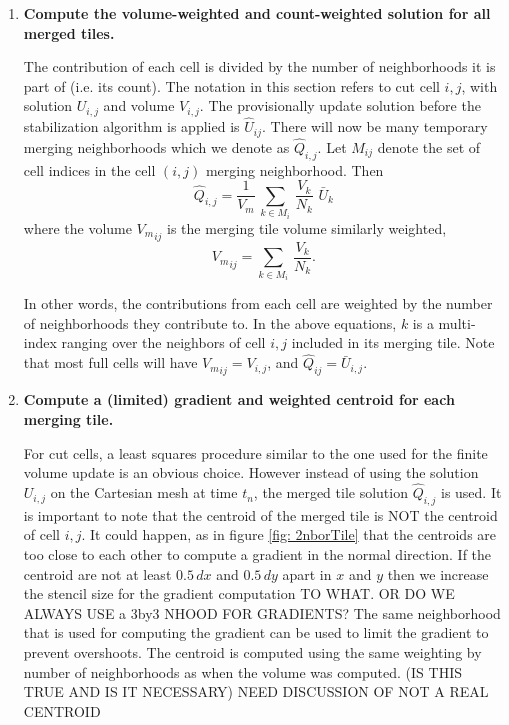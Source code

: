 \begin{enumerate}
\item
{\bf Compute the volume-weighted and count-weighted solution for all
merged tiles.}   

\vspace*{.1in}
The contribution of each cell is divided by the number of neighborhoods 
it is part of (i.e. its count). The notation in this section refers
to cut cell $i,j$, with solution $U_{i,j}$ and volume
$V_{i,j}$. 
The provisionally update solution before the
stabilization algorithm is applied is $\hat{U}_{ij}$.
There will now be many temporary merging neighborhoods which 
we denote as $\widehat{Q}_{i,j}$. 
Let $M_{ij}$ denote the set of cell indices in the cell $(i,j)$ merging
neighborhood.  Then
\begin{equation}
\label{tiledef}
\widehat{Q}_{i,j} =  \frac{1}{V_m} \, \sum_{k \in M_i} \,  
\frac{V_k}{N_k}  \,\,  \bar{U}_k
\end{equation}
where the volume ${V_m}_{ij}$ is the merging tile volume similarly weighted,
\begin{equation}
\label{voldef}
{V_m}_{ij}  =  \sum_{k \in M_i } \,  \frac{V_k}{N_k}  .
\end{equation}

In other words, the contributions from each cell are weighted by the
number of neighborhoods they contribute to.
In the above equations, $k$ is  a multi-index ranging over the neighbors 
of cell $i,j$ included in its merging tile.
Note that most full cells will have ${V_m}_{ij} = V_{i,j}$, 
and $\widehat{Q}_{ij}  = \bar{U}_{i,j}$.





\item
{\bf Compute a (limited) gradient and weighted centroid for each merging
tile.}

\vspace*{.1in}
For cut cells, a least squares procedure  similar to the one used for
the finite volume update is an obvious choice. However instead of using the
solution $U_{i,j}$ on the Cartesian mesh at time $t_n$,
the merged tile solution  $\widehat{Q}_{i,j}$ is used. It is important
to note that the centroid of the merged tile is NOT the 
centroid of cell ${i,j}$. It could happen, as in figure \ref{fig:
2nborTile} that the centroids are too close to each other to compute a
gradient in the normal direction. If the centroid are not at least
$0.5\,dx$  and $0.5\,dy$ apart in $x$ and $y$ then we increase the
stencil size for the gradient computation TO WHAT. OR DO WE ALWAYS USE a
3by3 NHOOD FOR GRADIENTS?
The same neighborhood that is used for computing the gradient can be
used to limit the gradient to prevent overshoots.
The centroid is computed using the same weighting by number of
neighborhoods as when the volume was computed. (IS THIS TRUE AND IS IT
NECESSARY) NEED DISCUSSION OF NOT A REAL CENTROID


\end{enumerate}
